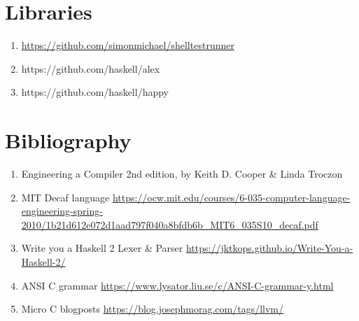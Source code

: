 \documentclass{article}
\begin{document}
\section{Libraries}
\begin{enumerate}
    \item \url{https://github.com/simonmichael/shelltestrunner}
    \item https://github.com/haskell/alex
    \item https://github.com/haskell/happy
\end{enumerate}


\section{Bibliography}
\begin{enumerate}
    \item  Engineering a Compiler 2nd edition, by Keith D. Cooper & Linda Troczon
    \item MIT Decaf language
    \url{https://ocw.mit.edu/courses/6-035-computer-language-engineering-spring-2010/1b21d612e072d1aad797f040a8bfdb6b_MIT6_035S10_decaf.pdf}
    \item Write you a Haskell 2 Lexer \& Parser \url{https://jktkops.github.io/Write-You-a-Haskell-2/}
    \item ANSI C grammar \url{https://www.lysator.liu.se/c/ANSI-C-grammar-y.html}
    \item Micro C blogposts
    \url{https://blog.josephmorag.com/tags/llvm/}
\end{enumerate}
\end{document}
